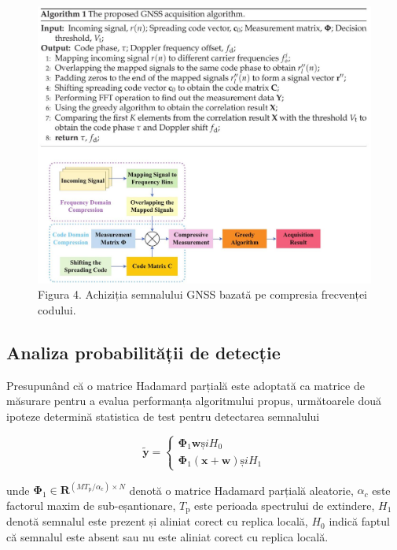 \documentclass[10pt]{report}
\begin{document}
\begin{figure}[h]
    \includegraphics[max width=15cm, center]{2023_06_04_7690788c3d6419e4c10eg-5(2)}
    \caption*{Figura 4. Achiziția semnalului GNSS bazată pe compresia frecvenței codului.}
\end{figure}

\subsection*{Analiza probabilității de detecție}
Presupunând că o matrice Hadamard parțială este adoptată ca matrice de măsurare pentru a evalua performanța algoritmului propus, următoarele două ipoteze determină statistica de test pentru detectarea semnalului

\begin{equation}
    \tilde{\mathbf{y}}=\left\{\begin{array}{cc}
        \boldsymbol{\Phi}_{1} \mathbf{w} și H_{0} \\
        \boldsymbol{\Phi}_{1}(\mathbf{x}+\mathbf{w}) și H_{1}
    \end{array}\right.
\end{equation}


unde \(\boldsymbol{\Phi}_{1} \in \mathbf{R}^{\left(M T_{\mathrm{p}} / \alpha_{c}\right) \times N}\) denotă o matrice Hadamard parțială aleatorie, \(\alpha_{c}\) este factorul maxim de sub-eșantionare, \(T_{\mathrm{p}}\) este perioada spectrului de extindere, \(H_{1}\) denotă semnalul este prezent și aliniat corect cu replica locală, \(H_{0}\) indică faptul că semnalul este absent sau nu este aliniat corect cu replica locală.
\end{document}
